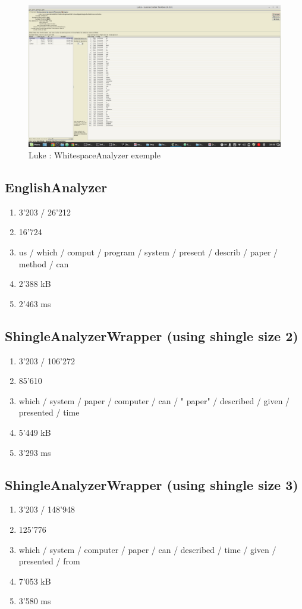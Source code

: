 \begin{figure}[H]
    \centering
    \includegraphics[width=1\linewidth, fbox]{img/Analyzers_White.png}
    \caption{Luke : WhitespaceAnalyzer exemple}
    \label{Analyzers_White}
\end{figure}

\subsection{EnglishAnalyzer}
\begin{enumerate}
    \item 3'203 / 26'212
    \item 16'724
    \item us / which / comput / program / system / present / describ / paper / method / can
    \item 2'388 kB
    \item 2'463 ms
\end{enumerate}
\subsection{ShingleAnalyzerWrapper (using shingle size 2)}
\begin{enumerate}
    \item 3'203 / 106'272
    \item 85'610
    \item which / system / paper / computer / can / " paper" / described / given / presented / time
    \item 5'449 kB
    \item 3'293 ms
\end{enumerate}
\subsection{ShingleAnalyzerWrapper (using shingle size 3)}
\begin{enumerate}
    \item 3'203 / 148'948
    \item 125'776
    \item which / system / computer / paper / can / described / time / given / presented / from
    \item 7'053 kB
    \item 3'580 ms
\end{enumerate}
